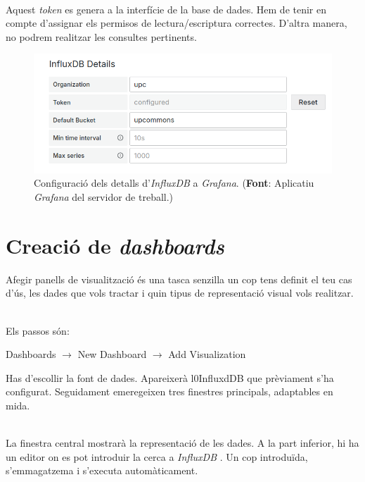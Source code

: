 \noindent \\
Aquest \textit{token} es genera a la interfície de la base de dades.
Hem de tenir en compte d’assignar els permisos de lectura/escriptura correctes.
D’altra manera, no podrem realitzar les consultes pertinents.

\begin{figure}[htbp]
    \centerline{\includegraphics[width=\textwidth]{figures/grafana-influxdb-details}}
    \captionsetup{justification=centering}
    \caption[Configuració dels detalls d'\textit{InfluxDB} a \textit{Grafana}.]{Configuració dels detalls d'\textit{InfluxDB} a \textit{Grafana}. (\textbf{Font}: Aplicatiu \textit{Grafana} del servidor de treball.)}\label{fig:grafana-influxdb-details}
\end{figure}

\clearpage

\section*{Creació de \textit{dashboards}}\label{sec:grafana-dashboards}

\noindent
Afegir panells de visualització és una tasca senzilla un cop tens definit el teu cas d'ús, les dades que vols tractar i quin tipus de representació visual vols realitzar.

\noindent \\
Els passos són:
\begin{center}
    Dashboards \(\rightarrow\) New Dashboard \(\rightarrow\) Add Visualization
\end{center}

\noindent
Has d’escollir la font de dades.
Apareixerà l0InfluxdDB que prèviament s’ha configurat.
Seguidament emeregeixen tres finestres principals, adaptables en mida.

\noindent \\
La finestra central mostrarà la representació de les dades.
A la part inferior, hi ha un editor on es pot introduir la cerca a \textit{InfluxDB} .
Un cop introduïda, s'emmagatzema i s'executa automàticament.


